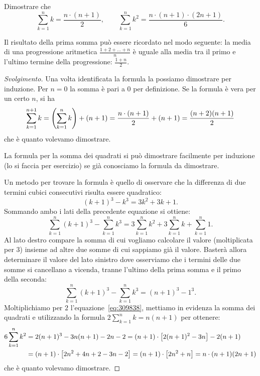 \begin{exercise}
  \label{ex:somma_lineare}%
  Dimostrare che 
  \[
    \sum_{k=1}^n k = \frac{n\cdot (n+1)}{2}, \qquad
    \sum_{k=1}^n k^2 = \frac{n\cdot (n+1)\cdot (2n+1)}{6}.
  \]
\end{exercise}
Il risultato della prima somma può essere ricordato nel modo seguente:
la media di una progressione aritmetica $\frac{1+2+ \dots + n}{n}$ 
è uguale alla media tra il primo 
e l'ultimo termine della progressione: $\frac{1+n}{2}$.
\begin{proof}[Svolgimento]

Una volta identificata la formula la possiamo dimostrare per induzione.
Per $n=0$ la somma è pari a $0$ per definizione.
Se la formula è vera per un certo $n$, si ha 
\[
  \sum_{k=1}^{n+1} k = {\left( \sum_{k=1}^n k \right)} + (n+1)
   = \frac{n\cdot(n+1)}{2} + (n+1) 
   = \frac{(n+2)(n+1)}{2}
\]
che è quanto volevamo dimostrare.

La formula per la somma dei quadrati si può dimostrare facilmente per 
induzione (lo si faccia per esercizio) se già conosciamo la formula da 
dimostrare.

Un metodo per trovare la formula è quello di osservare che la differenza 
di due termini cubici consecutivi risulta essere quadratico:
\[
(k+1)^3 - k^3 = 3 k^2 + 3k + 1.  
\]
Sommando ambo i lati della precedente equazione si ottiene:
\begin{equation}\label{eq:309838}
\sum_{k=1}^n (k+1)^3 - \sum_{k=1}^n k^3 
= 3\sum_{k=1}^n k^2+3\sum_{k=1}^n k+\sum_{k=1}^n 1.
\end{equation}
Al lato destro compare la somma di cui vogliamo calcolare il valore 
(moltiplicata per $3$)
insieme ad altre due somme di cui sappiamo già il valore. 
Basterà allora determinare il valore del lato sinistro dove 
osserviamo che i termini delle due somme si cancellano 
a vicenda,
tranne l'ultimo della prima somma 
e il primo della seconda: 
\[
  \sum_{k=1}^n(k+1)^3 - \sum_{k=1}^n k^3 = (n+1)^3 - 1^3.
\]
Moltiplichiamo per $2$ l'equazione~\eqref{eq:309838},
mettiamo in evidenza la somma dei quadrati e 
utilizzando la formula $2\sum_{k=1}^n k = n(n+1)$
per ottenere:
\begin{align*}
  6 \sum_{k=1}^n k^2 
  &=  2(n+1)^3 - 3 n(n+1) - 2n - 2
  = (n+1) \cdot {\left[ 2(n+1)^2 - 3n \right]} - 2(n+1)\\
  &= (n+1)\cdot {\left[ 2n^2+4n+2 -3n - 2 \right]}
   = (n+1)\cdot {\left[ 2n^2+n \right]} 
   = n \cdot (n+1)(2n+1)
\end{align*}
che è quanto volevamo dimostrare.
\end{proof}

